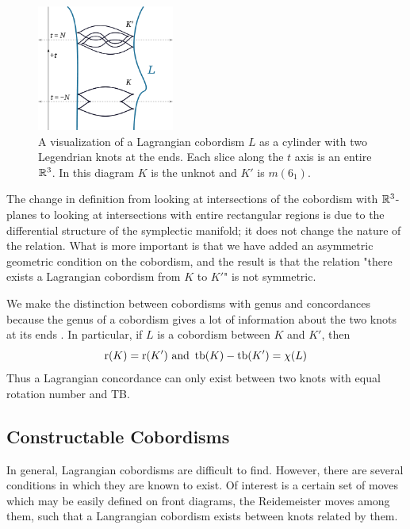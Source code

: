 \begin{figure}[ht]
    \centering
    \includegraphics[width=0.4\textwidth]{images/cobordism-visualization.pdf}
    \caption{A visualization of a Lagrangian cobordism $L$ as a cylinder with two Legendrian knots at the ends. Each slice along the $t$ axis is an entire $\mathbb{R}^3$. In this diagram $K$ is the unknot and $K'$ is $m(6_1)$.}%
    \label{fig:cobordism-vis}
\end{figure}

The change in definition from looking at intersections of the cobordism with $\mathbb{R}^3$-planes to looking at intersections with entire rectangular regions is due to the differential structure of the symplectic manifold; it does not change the nature of the relation. What is more important is that we have added an asymmetric geometric condition on the cobordism, and the result is that the relation "there exists a Lagrangian cobordism from $K$ to $K'$" is not symmetric.

We make the distinction between cobordisms with genus and concordances because the genus of a cobordism gives a lot of information about the two knots at its ends \cite{chantraine2010}. In particular, if $L$ is a cobordism between $K$ and $K'$, then
\[
    \operatorname{r}(K) = \operatorname{r}(K') \text{     and     } \operatorname{tb}(K) - \operatorname{tb}(K') = \chi(L)
\]
Thus a Lagrangian concordance can only exist between two knots with equal rotation number and TB.


\subsection{Constructable Cobordisms}

In general, Lagrangian cobordisms are difficult to find. However, there are several conditions in which they are known to exist. Of interest is a certain set of moves which may be easily defined on front diagrams, the Reidemeister moves among them, such that a Langrangian cobordism exists between knots related by them.

